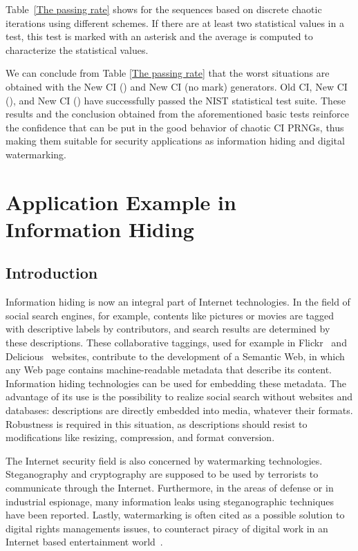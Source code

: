 \documentclass[journal]{IEEEtran}
\begin{document}
Table~\ref{The passing rate} shows  for the sequences based on discrete chaotic iterations using different schemes. If there are at least two statistical values in a test, this test is marked with an asterisk and the average is computed to characterize the statistical values.

We can conclude from Table \ref{The passing rate} that the worst situations are obtained with the New CI () and New CI (no mark) generators. Old CI, New CI (), and New CI () have successfully passed the NIST statistical test suite. These results and the conclusion obtained from the aforementioned basic tests reinforce the confidence that can be put in the good behavior of chaotic CI PRNGs, thus making them suitable for security applications as information hiding and digital watermarking.



\section{Application Example in Information Hiding}
\label{An application example of the proposed PRNG}


\subsection{Introduction}

Information hiding is now an integral part of Internet technologies. In the field of social search engines, for example, contents like pictures or movies are tagged with descriptive labels by contributors, and search results are determined by these descriptions. These collaborative taggings, used for example in Flickr~\cite{Frick} and Delicious~\cite{Delicious} websites, contribute to the development of a Semantic Web, in which any Web page contains machine-readable metadata that describe its content. Information hiding technologies can be used for embedding these metadata. The advantage of its use is the possibility to realize  social search without websites and databases: descriptions are directly embedded into media, whatever their formats. Robustness is required in this situation, as descriptions should resist to modifications like resizing, compression, and format conversion.

The Internet security field is also concerned by watermarking technologies. Steganography and cryptography are supposed to be used by terrorists to communicate through the Internet. Furthermore, in the areas of defense or in industrial espionage, many information leaks using steganographic techniques have been reported. Lastly, watermarking is often cited as a possible solution to digital rights managements issues, to counteract piracy of digital work in an Internet based entertainment world~\cite{Nakashima2003}.
\end{document}
